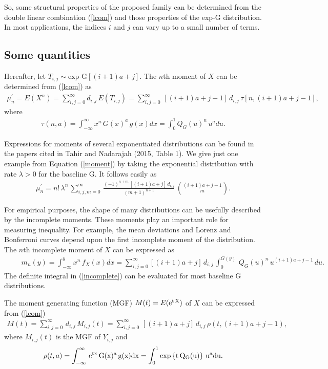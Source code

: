 \documentclass[twoside,leqno,11pt]{article}
\begin{document}
So, some structural properties of the proposed family can be determined from the double linear combination (\ref{lcom})
and those properties of the exp-G distribution. In most applications, the indices $i$ and $j$ can vary up to a small 
number of terms. 


\subsection{Some quantities}

Hereafter, let $T_{i,j}\sim$exp-G$[(i+1)a+j]$. The $n$th moment of $X$ can be determined from (\ref{lcom}) as
{\footnotesize
\begin{eqnarray}\label{moment}
\displaystyle
\mu_n^{\prime}=E(X^n)=\sum_{i,j=0}^\infty d_{i,j}\,E(T_{i,j})=\sum_{i,j=0}^\infty \,[(i+1)a+j-1]\,d_{i,j}\,\tau[n,(i+1)a+j-1],
\end{eqnarray}
}
where
\begin{eqnarray*}
\tau(n,a)=\int_{-\infty}^{\infty} x^n\,G(x)^{a}\,g(x)dx=\int_{0}^{1} Q_G(u)^n\,u^a d u.
\end{eqnarray*}

Expressions for moments of several exponentiated distributions can be found in the papers cited in Tahir and Nadarajah (2015, Table 1). We give just one example from Equation (\ref{moment})
by taking the exponential distribution with rate $\lambda>0$ for the baseline G.
It follows easily as
\begin{eqnarray*}
\mu_n^{\prime}= n!\,\lambda^n\,\sum_{i,j,m=0}^\infty \,\frac{(-1)^{n+m}\,[(i+1)a+j]\,d_{i,j}}{(m+1)^{n+1}}\,\binom{(i+1)a+j-1}{m}.
\end{eqnarray*}

For empirical purposes, the shape of many distributions can be usefully described by the incomplete moments. These moments play an important role for measuring
inequa\-lity. For example, the mean deviations and Lorenz and Bonferroni curves depend upon the first incomplete moment of the distribution.
The $n$th incomplete moment of $X$ can be expressed as
{\footnotesize
\begin{eqnarray}\label{incomplete}
\displaystyle
\qquad
m_{n}(y)=\int_{-\infty}^y x^n\,f_{X}(x) dx = \sum_{i,j=0}^{\infty} [(i+1)a+j]\,d_{i,j}\,\int_{0}^{G(y)}\,Q_G(u)^n\, u^{(i+1)a+j-1}\,du.
\end{eqnarray}
}
The definite integral in (\ref{incomplete}) can be evaluated for most baseline G distributions.

The moment generating function (MGF) $M(t)=E(\rm{e}^{t\,X})$ of $X$ can be expressed from (\ref{lcom})
{\footnotesize
\begin{eqnarray}\label{mgf}
\displaystyle
M(t)=\sum_{i,j=0}^{\infty} \,d_{i,j}\,M_{i,j}(t)=\sum_{i,j=0}^{\infty}\, [(i+1)a+j]\,d_{i,j}\,\rho(t,(i+1)a+j-1),
\end{eqnarray}
}
where $M_{i,j}(t)$ is the MGF of $Y_{i,j}$ and
\begin{eqnarray*}
\rho(t,a)=\int_{-\infty}^{\infty}\,\rm{e}^{t x}\,G(x)^{a}\,g(x) dx=\int_{0}^{1}\exp\left\{t\,Q_G(u)\right\}\,u^a d u.
\end{eqnarray*}
\end{document}
